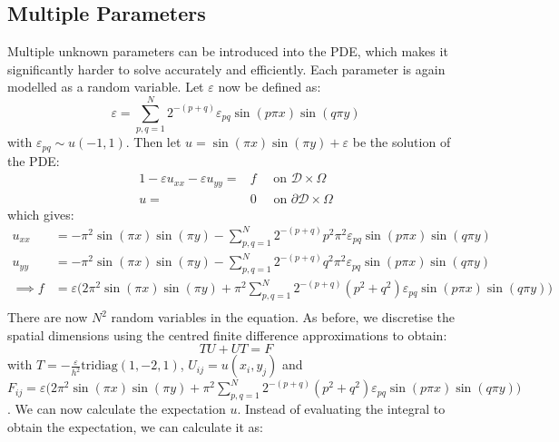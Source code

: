 \documentclass[11pt]{article}
\numberwithin{equation}{section}
\begin{document}
\subsection{Multiple Parameters}
Multiple unknown parameters can be introduced into the PDE, which makes it significantly harder to solve accurately and efficiently. Each parameter is again modelled as a random variable. Let $\varepsilon$ now be defined as:
\begin{equation}
\varepsilon = \sum_{p,q = 1}^N 2^{-(p+q)} \varepsilon_{pq} \sin(p \pi x) \sin(q \pi y)
\end{equation}
with $\varepsilon_{pq} \sim u(-1,1)$. Then let $u = \sin(\pi x)\sin(\pi y) + \varepsilon$ be the solution of the PDE:
\begin{alignat}{1}
-\varepsilon u_{xx} -\varepsilon u_{yy} = {}& f \quad \text{ on } \mathcal{D} \times \Omega \nonumber \\
u = {}& 0 \quad \text{ on } \partial \mathcal{D} \times \Omega
\end{alignat}
which gives:
\begin{equation}
\begin{split}
u_{xx} &= -\pi^2 \sin(\pi x)\sin(\pi y) - \sum_{p,q=1}^N 2^{-(p+q)} p^2 \pi^2 \varepsilon_{pq} \sin(p\pi x)\sin(q\pi y) \\
u_{yy} &= -\pi^2 \sin(\pi x)\sin(\pi y) - \sum_{p,q=1}^N 2^{-(p+q)} q^2 \pi^2 \varepsilon_{pq} \sin(p\pi x)\sin(q\pi y) \\
\implies f &= \varepsilon \Big(2\pi^2 \sin(\pi x) \sin(\pi y) + \pi^2 \sum_{p,q=1}^N 2^{-(p+q)} (p^2 + q^2) \varepsilon_{pq} \sin(p \pi x)\sin(q \pi y) \Big) \\
\end{split}
\end{equation}
There are now $N^2$ random variables in the equation. As before, we discretise the spatial dimensions using the centred finite difference approximations to obtain:
\begin{equation}
TU + UT = F
\end{equation}
with $T= -\frac{\varepsilon}{h^2}\text{tridiag}(1,-2,1)$, $U_{ij} = u(x_i,y_j)$ and $F_{ij}=\varepsilon \Big(2\pi^2 \sin(\pi x) \sin(\pi y) + \pi^2 \sum_{p,q=1}^N 2^{-(p+q)} (p^2 + q^2) \varepsilon_{pq} \sin(p \pi x)\sin(q \pi y) \Big)$. We can now calculate the expectation $u$. Instead of evaluating the integral to obtain the expectation, we can calculate it as:
\end{document}
